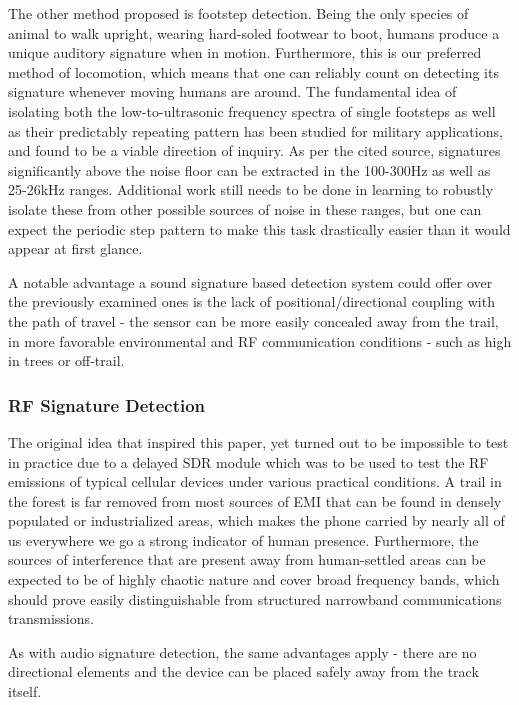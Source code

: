 \documentclass[10pt,nocopyrightspace]{ewsn-proc}
\begin{document}
The other method proposed is footstep detection. Being the only species of animal to walk upright, wearing hard-soled footwear to boot, humans produce a unique auditory signature when in motion. Furthermore, this is our preferred method of locomotion, which means that one can reliably count on detecting its signature whenever moving humans are around. The fundamental idea of isolating both the low-to-ultrasonic frequency spectra of single footsteps as well as their predictably repeating pattern has been studied for military applications\cite{NATOfootsteps}, and found to be a viable direction of inquiry. As per the cited source, signatures significantly above the noise floor can be extracted in the 100-300Hz as well as 25-26kHz ranges. Additional work still needs to be done in learning to robustly isolate these from other possible sources of noise in these ranges, but one can expect the periodic step pattern to make this task drastically easier than it would appear at first glance. 

A notable advantage a sound signature based detection system could offer over the previously examined ones is the lack of positional/directional coupling with the path of travel - the sensor can be more easily concealed away from the trail, in more favorable environmental and RF communication conditions - such as high in trees or off-trail.

\subsubsection{RF Signature Detection}
The original idea that inspired this paper, yet turned out to be impossible to test in practice due to a delayed SDR module which was to be used to test the RF emissions of typical cellular devices under various practical conditions. A trail in the forest is far removed from most sources of EMI that can be found in densely populated or industrialized areas, which makes the phone carried by nearly all of us everywhere we go a strong indicator of human presence. Furthermore, the sources of interference that are present away from human-settled areas can be expected to be of highly chaotic nature and cover broad frequency bands, which should prove easily distinguishable from structured narrowband communications transmissions.

As with audio signature detection, the same advantages apply - there are no directional elements and the device can be placed safely away from the track itself.
 
\end{document}
